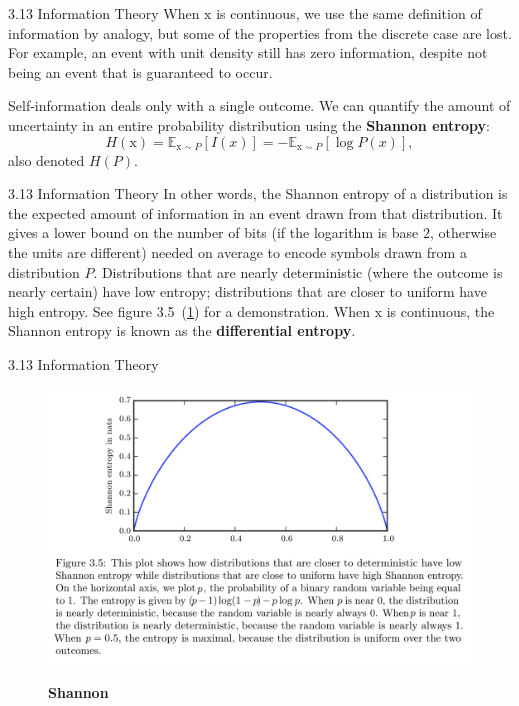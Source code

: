 \begin{frame}{3.13 Information Theory}
    \justifying
    When $\mathrm{x}$ is continuous, we use the same definition of information by analogy, but some of the properties from the discrete case are lost. For example, an event with unit density still has zero information, despite not being an event that is guaranteed to occur.
    
    Self-information deals only with a single outcome. We can quantify the amount of uncertainty in an entire probability distribution using the \textbf{Shannon entropy}: 
    \begin{equation}
        H(\mathrm{x}) = \mathbb{E}_{\mathrm{x} \sim P}[I(x)] = -\mathbb{E}_{\mathrm{x} \sim P}[\log{P(x)}],
        \label{eq:3_49}
    \end{equation}
    also denoted $H(P)$.
\end{frame}

\begin{frame}{3.13 Information Theory}
    \justifying
    In other words, the Shannon entropy of a distribution is the expected amount of information in an event drawn from that distribution. It gives a lower bound on the number of bits (if the logarithm is base $2$, otherwise the units are different) needed on average to encode symbols drawn from a distribution $P$. Distributions that are nearly deterministic (where the outcome is nearly certain) have low entropy; distributions that are closer to uniform have high entropy. See figure 3.5~(\ref{fig:3_5shannon}) for a demonstration. When $\mathrm{x}$ is continuous, the Shannon entropy is known as the \textbf{differential entropy}.
\end{frame}

\begin{frame}{3.13 Information Theory}
    \begin{figure}
        \centering
        \includegraphics[scale=0.20]{images/3-5-shannon.png}
        \label{fig:3_5shannon}
        \caption{\textbf{Shannon}}
    \end{figure}
\end{frame}

